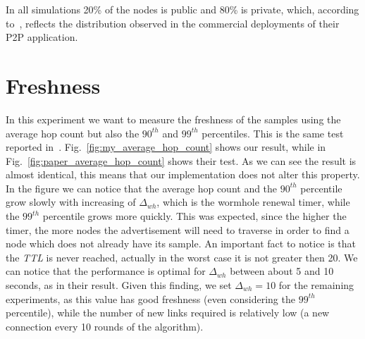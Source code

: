 In all simulations 20\% of the nodes is public and 80\% is private, which, according to~\cite{wormhole}, reflects the distribution observed in the commercial deployments of their P2P application.

\section{Freshness}
\label{sec:eval_freshness}
In this experiment we want to measure the freshness of the samples using the average hop count but also the \textit{$90^{th}$} and \textit{$99^{th}$} percentiles. This is the same test reported in~\cite{wormhole}. Fig.~\ref{fig:my_average_hop_count} shows our result, while in Fig.~\ref{fig:paper_average_hop_count} shows their test. As we can see the result is almost identical, this means that our implementation does not alter this property. In the figure we can notice that the average hop count and the $90^{th}$ percentile grow slowly with increasing of $\Delta_{wh}$, which is the wormhole renewal timer, while the $99^{th}$ percentile grows more quickly. This was expected, since the higher the timer, the more nodes the advertisement will need to traverse in order to find a node which does not already have its sample. An important fact to notice is that the \textit{TTL} is never reached, actually in the worst case it is not greater then 20. We can notice that the performance is optimal for $\Delta_{wh}$  between about 5 and 10 seconds, as in their result. Given this finding, we set $\Delta_{wh} = 10$ for the remaining experiments, as this value has good freshness (even considering the $99^{th}$ percentile), while the number of new links required is relatively low (a new connection every 10 rounds of the algorithm). 

